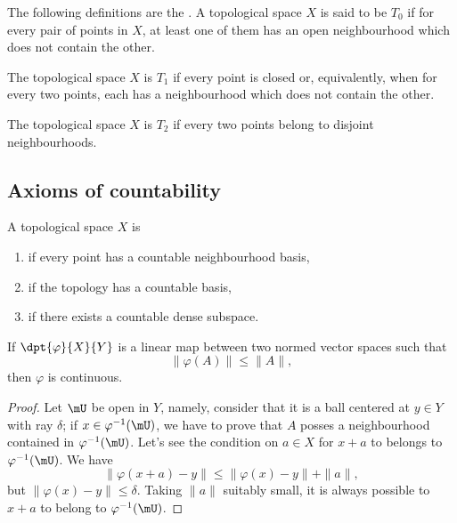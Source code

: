 The following definitions are the . A topological space $X$ is said to be $T_0$ if for every pair of points in $X$, at least one of them has an open neighbourhood which does not contain the other.

The topological space $X$ is $T_1$ if every point is closed or, equivalently, when for every two points, each has a neighbourhood which does not contain the other.

The topological space $X$ is $T_2$ if every two points belong to disjoint neighbourhoods.


\subsection{Axioms of countability}	

A topological space $X$ is
\begin{enumerate}
	\item {} if every point has a countable neighbourhood basis,
	\item {} if the topology has a countable basis,
	\item {} if there exists a countable dense subspace.
\end{enumerate}


\begin{lemma}
	If $\dpt{\varphi}{X}{Y}$ is a linear map between two normed vector spaces such that
	\[
		\| \varphi(A) \|\leq \| A \|,
	\]
	then $\varphi$ is continuous.
	\label{lem:lin_vec_cont}
\end{lemma}

\begin{proof}
	Let $\mU$ be open in $Y$, namely, consider that it is a ball centered at $y\in Y$ with ray $\delta$; if $x\in\varphi^{-1}(\mU)$, we have to prove that $A$ posses a neighbourhood contained in $\varphi^{-1}(\mU)$. Let's see the condition on $a\in X$ for $x+a$ to belongs to $\varphi^{-1}(\mU)$. We have
	\[
		\| \varphi(x+a)-y \|\leq\| \varphi(x)-y \|+\| a \|,
	\]
	but $\| \varphi(x)-y \|\leq \delta$. Taking $\| a \|$ suitably small, it is always possible to $x+a$ to belong to $\varphi^{-1}(\mU)$.
\end{proof}

